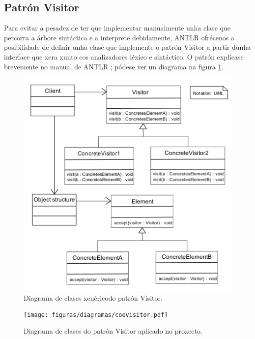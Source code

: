 \subsection{Patrón Visitor}
\label{subsec:visitor}
Para evitar a pesadez de ter que implementar manualmente unha clase que percorra
a árbore sintáctica e a interprete debidamente, ANTLR ofrécenos a posibilidade
de definir unha clase que implemente o patrón Visitor a partir dunha interface
que xera xunto cos analizadores léxico e sintáctico. O patrón explícase
brevemente no manual de ANTLR \cite{antlr4}; pódese ver un diagrama na figura
\ref{fig:visitor}.

\begin{figure}
\centerline{\includegraphics{figuras/diagramas/visitor.png}}
\caption{Diagrama de clases xenéricodo patrón Visitor.}
\label{fig:visitor}
\end{figure}

\begin{figure}
\centerline{\texttt{[image: figuras/diagramas/coevisitor.pdf]}}
\caption{Diagrama de clases do patrón Visitor aplicado no proxecto.}
\label{fig:coevisitor}
\end{figure}

